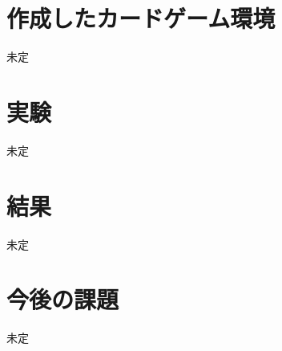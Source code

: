 \documentclass[twocolumn]{jarticle}     %
\begin{document}
\section{作成したカードゲーム環境}
未定
\section{実験}
未定

\section{結果}
未定
\section{今後の課題}
未定




\end{document}

